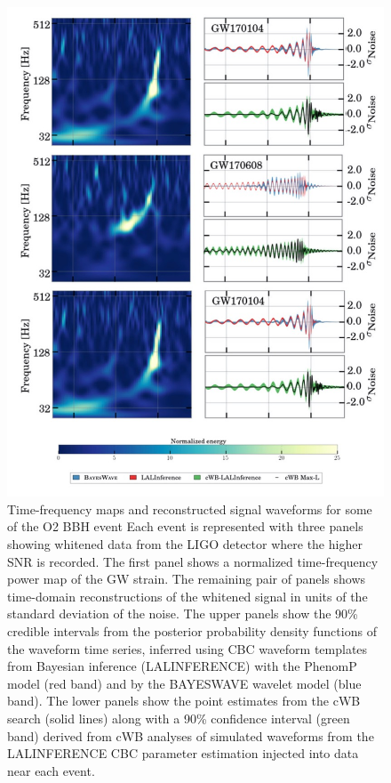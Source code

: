 \documentclass[binding=0.6cm, LaM]{sapthesis}
\begin{document}
		\begin{figure}[H]
                        \label{o2}
                        \includegraphics[scale=0.45]{o2}
                        \centering
                        \caption{Time-frequency maps and reconstructed signal waveforms for some of the O2 BBH event Each event is represented with three panels showing whitened data from the LIGO detector where the higher SNR is recorded. The first panel shows a normalized time-frequency power map of the GW strain. The remaining pair of panels shows time-domain reconstructions of the whitened signal in units of the standard deviation of the noise. The upper panels show the 90\% credible intervals from the posterior probability density functions of the waveform time series, inferred using CBC waveform templates from Bayesian inference (LALINFERENCE) with the PhenomP model (red band) and by the BAYESWAVE wavelet model (blue band). The lower panels show the point estimates from the cWB search (solid lines) along with a 90\% confidence interval (green band) derived from cWB analyses of simulated waveforms from the LALINFERENCE CBC parameter estimation injected into data near each event.}
                         \label{fig:o2}
                \end{figure}
\end{document}
